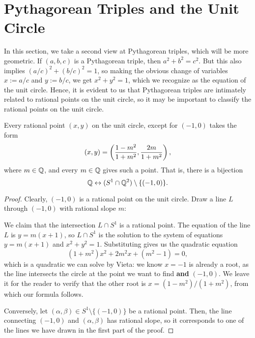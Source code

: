 \documentclass{article}
\begin{document}
\section{Pythagorean Triples and the Unit Circle}
In this section, we take a second view at Pythagorean triples, which will be more geometric. If $(a,b,c)$ is a Pythagorean triple, then $a^2 + b^2 = c^2$. But this also implies $(a/c)^2 + (b/c)^2 = 1$, so making the obvious change of variables $x := a/c$ and $y := b/c$, we get $x^2 + y^2 = 1$, which we recognize as the equation of the unit circle. Hence, it is evident to us that Pythagorean triples are intimately related to rational points on the unit circle, so it may be important to classify the rational points on the unit circle.
\begin{theorem}
Every rational point $(x,y)$ on the unit circle, except for $(-1, 0)$ takes the form
$$(x,y) = \left(\frac{1-m^2}{1+m^2}, \frac{2m}{1+m^2} \right),$$ \newpage
where $m\in \mathbb Q$, and every $m\in\mathbb Q$ gives such a point. That is, there is a bijection $$\mathbb Q \leftrightarrow (S^1 \cap \mathbb Q^2) \setminus \{(-1, 0)\}.$$
\end{theorem}
\begin{proof}
Clearly, $(-1,0)$ is a rational point on the unit circle. Draw a line $L$ through $(-1,0)$ with rational slope $m$:
\begin{center}
\end{center}
We claim that the intersection $L\cap S^1$ is a rational point. The equation of the line $L$ is $y = m(x+1)$, so $L\cap S^1$ is the solution to the system of equations $y = m(x+1)$ and $x^2 + y^2 = 1$. Substituting gives us the quadratic equation
$$(1 + m^2)x^2 + 2m^2x + (m^2-1) = 0,$$
which is a quadratic we can solve by Vieta: we know $x=-1$ is already a root, as the line intersects the circle at the point we want to find \textbf{and} $(-1, 0)$. We leave it for the reader to verify that the other root is $x = (1-m^2)/(1+m^2)$, from which our formula follows.

Conversely, let $(\alpha, \beta)\in S^1\setminus\{(-1, 0)\}$ be a rational point. Then, the line connecting $(-1,0)$ and $(\alpha, \beta)$ has rational slope, so it corresponds to one of the lines we have drawn in the first part of the proof.
\end{proof}
\end{document}
